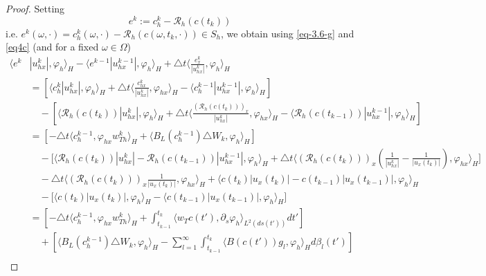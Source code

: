 \documentclass[a4paper,10pt]{article}
\def\Bapprox{B_L}
\numberwithin{equation}{section}
\begin{document}
\begin{proof}
Setting $$e^{k}:= c^{k}_{h} - \mathcal{R}_{h}(c(t_{k}))$$
i.e. $ e^{k}(\omega, \cdot) = c^{k}_{h}(\omega,\cdot) - \mathcal{R}_{h}(c(\omega,t_{k}, \cdot)) \in S_{h}$,
we obtain using \eqref{eq-3.6-g} and \eqref{eq4c} (and for a fixed $\omega \in \Omega$)
\begin{align*}
\langle e^{k} & |u^{k}_{hx}|, \varphi_{h } \rangle_{H} - \langle e^{k-1} |u^{k-1}_{hx}|, \varphi_{h } \rangle_{H} + \triangle t \langle \frac{e^{k}_{x}}{ |u^{k}_{hx}|}, \varphi_{h } \rangle_{H} \\
& = \left[ \langle c^{k}_{h}| u^{k}_{hx}|, \varphi_{h}\rangle_{H} + \triangle t \langle \frac{c^{k}_{hx}}{| u^{k}_{hx}|}, \varphi_{hx} \rangle_{H} - \langle c^{k-1}_{h} | u^{k-1}_{hx}|, \varphi_{h}\rangle_{H}
\right]\\
&\quad - \left[ \langle \mathcal{R}_{h}(c(t_{k}))| u^{k}_{hx}|, \varphi_{h}\rangle_{H} + \triangle t \langle \frac{(\mathcal{R}_{h}(c(t_{k})))_{x}}{| u^{k}_{hx}|}, \varphi_{hx} \rangle_{H} - \langle \mathcal{R}_{h}(c(t_{k-1})) | u^{k-1}_{hx}|, \varphi_{h}\rangle_{H} \right]
\\
&=\left[-\triangle t \langle c^{k-1}_{h}, \varphi_{hx} w_{Th}^{k} \rangle_{H} + \langle \Bapprox(c^{k-1}_{h})\triangle W_{k}, \varphi_{h}\rangle_{H} \right]
\\
& \quad - \big[ \langle \mathcal{R}_{h}(c(t_{k})) | u^{k}_{hx}| - \mathcal{R}_{h}(c(t_{k-1})) | u^{k-1}_{hx}|, \varphi_{h}\rangle_{H} + \triangle t \langle (\mathcal{R}_{h}(c(t_{k})))_{x} ( \frac{1}{| u^{k}_{hx}|} - \frac{1}{| u_{x}(t_{k})|}), \varphi_{hx} \rangle_{H} \big]\\
& \quad - \triangle t \langle (\mathcal{R}_{h}(c(t_{k})))_{x} \frac{1}{| u_{x}(t_{k})|}, \varphi_{hx} \rangle_{H} + \langle c(t_{k}) |u_{x}(t_{k})|-c(t_{k-1}) |u_{x}(t_{k-1})|, \varphi_{h}\rangle_{H} \\
&\quad - 
\big[ \langle c(t_{k}) |u_{x}(t_{k})|, \varphi_{h}\rangle_{H}
- \langle c(t_{k-1}) |u_{x}(t_{k-1})|, \varphi_{h}\rangle_{H} \big]\\
&=\left[-\triangle t \langle c^{k-1}_{h}, \varphi_{hx} w_{Th}^{k} \rangle_{H}
+ \int_{t_{k-1}}^{t_{k}} \langle w_{T} c(t'), \partial_{s} \varphi_{h} \rangle_{L^{2} (ds(t'))} dt' \right]\\
& \quad
+ \left[ \langle \Bapprox(c^{k-1}_{h})\triangle W_{k}, \varphi_{h}\rangle_{H}
-\sum_{l=1}^{\infty}\int_{t_{k-1}}^{t_{k}} \langle B (c(t')) g_{l} , \varphi_{h} \rangle_{H} d \beta_{l}(t') 
\right]
\\

\end{align*}
\end{proof}
\end{document}
